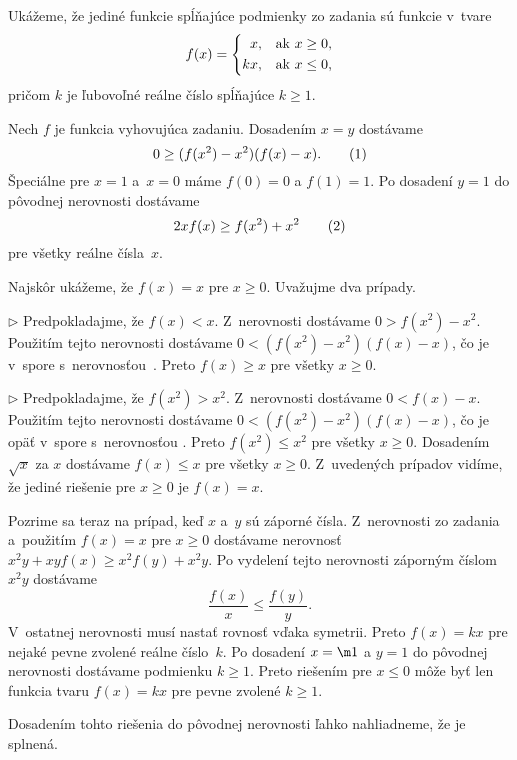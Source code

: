 {%
Ukážeme, že jediné funkcie spĺňajúce podmienky zo zadania sú funkcie v~tvare
$$
f(x) = \left\{
\aligned
  x,& \quad\text{ak $x\ge 0$,} \\
 kx,& \quad\text{ak $x\le 0$,}
\endaligned
\right.
$$
pričom $k$ je ľubovoľné reálne číslo spĺňajúce $k\ge1$.

Nech $f$ je funkcia vyhovujúca zadaniu. Dosadením $x=y$ dostávame
$$
0\ge (f(x^2)-x^2)(f(x)-x). \tag1
$$
Špeciálne pre $x=1$ a~$x=0$ máme $f(0) = 0$ a $f(1) = 1$. Po dosadení $y=1$ do pôvodnej nerovnosti dostávame
$$
2xf(x) \ge f(x^2) + x^2 \tag2
$$
pre všetky reálne čísla~$x$.

Najskôr ukážeme, že $f(x) = x$ pre $x\ge 0$. Uvažujme dva prípady.
\item{$\triangleright$}
Predpokladajme, že $f(x) < x$. Z~nerovnosti  dostávame $0 > f(x^2) - x^2$. Použitím tejto nerovnosti dostávame $0 < (f(x^2)-x^2)(f(x)-x)$, čo je v~spore s~nerovnosťou~. Preto $f(x) \ge x$ pre všetky $x\ge 0$.
\item{$\triangleright$}
Predpokladajme, že $f(x^2) > x^2$. Z~nerovnosti  dostávame $0 < f(x)-x$. Použitím tejto nerovnosti dostávame $0 < (f(x^2)-x^2)(f(x)-x)$, čo je opäť v~spore s~nerovnosťou . Preto $f(x^2)\le x^2$ pre všetky $x\ge0$. Dosadením $\sqrt{x}$ za $x$ dostávame $f(x)\le x$ pre všetky $x\ge0$.
\endgraf\noindent
Z~uvedených prípadov vidíme, že jediné riešenie pre $x\ge0$ je $f(x) = x$.

Pozrime sa teraz na prípad, keď $x$ a~$y$ sú záporné čísla. Z~nerovnosti zo zadania a~použitím $f(x) = x$ pre $x\ge0$ dostávame nerovnosť $x^2y + xyf(x) \ge x^2f(y) + x^2y$. Po vydelení tejto nerovnosti záporným číslom $x^2y$ dostávame
$$
\frac{f(x)}{x} \le \frac{f(y)}{y}.
$$
V~ostatnej nerovnosti musí nastať rovnosť vďaka symetrii. Preto $f(x) = kx$ pre nejaké pevne zvolené reálne číslo~$k$. Po dosadení $x=\m1$ a $y =1$ do pôvodnej nerovnosti dostávame podmienku $k\ge1$. Preto riešením pre $x\le 0$ môže byť len funkcia tvaru $f(x) = kx$ pre pevne zvolené $k\ge1$.

Dosadením tohto riešenia do pôvodnej nerovnosti ľahko nahliadneme, že je splnená.
}

